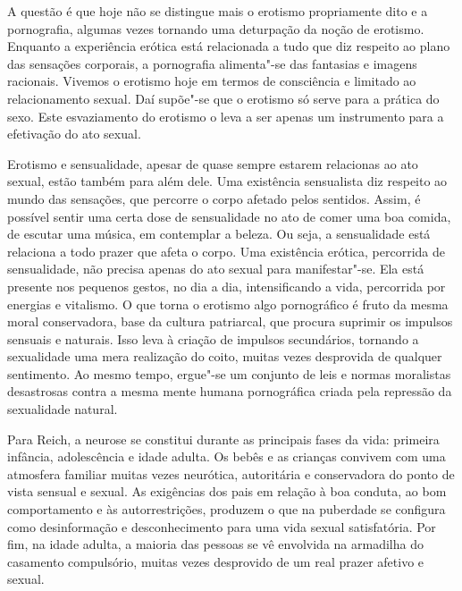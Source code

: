 A questão é que hoje não se distingue mais o erotismo propriamente dito
e a pornografia, algumas vezes tornando uma deturpação da noção de
erotismo. Enquanto a experiência erótica está relacionada a tudo que diz
respeito ao plano das sensações corporais, a pornografia alimenta"-se das
fantasias e imagens racionais. Vivemos o erotismo hoje em termos de
consciência e limitado ao relacionamento sexual. Daí supõe"-se que o
erotismo só serve para a prática do sexo. Este esvaziamento do erotismo
o leva a ser apenas um instrumento para a efetivação do ato sexual.

Erotismo e sensualidade, apesar de quase sempre estarem relacionas ao
ato sexual, estão também para além dele. Uma existência sensualista diz
respeito ao mundo das sensações, que percorre o corpo afetado pelos
sentidos. Assim, é possível sentir uma certa dose de sensualidade no ato
de comer uma boa comida, de escutar uma música, em contemplar a beleza.
Ou seja, a sensualidade está relaciona a todo prazer que afeta o corpo.
Uma existência erótica, percorrida de sensualidade, não precisa apenas
do ato sexual para manifestar"-se. Ela está presente nos pequenos gestos,
no dia a dia, intensificando a vida, percorrida por energias e
vitalismo. O que torna o erotismo algo pornográfico é fruto da mesma
moral conservadora, base da cultura patriarcal, que procura suprimir os
impulsos sensuais e naturais. Isso leva à criação de impulsos
secundários, tornando a sexualidade uma mera realização do coito, muitas
vezes desprovida de qualquer sentimento. Ao mesmo tempo, ergue"-se um
conjunto de leis e normas moralistas desastrosas contra a mesma mente
humana pornográfica criada pela repressão da sexualidade natural.

Para Reich, a neurose se constitui durante as principais fases da vida:
primeira infância, adolescência e idade adulta. Os bebês e as crianças
convivem com uma atmosfera familiar muitas vezes neurótica, autoritária
e conservadora do ponto de vista sensual e sexual. As exigências dos
pais em relação à boa conduta, ao bom comportamento e às
autorrestrições, produzem o que na puberdade se configura como
desinformação e desconhecimento para uma vida sexual satisfatória. Por
fim, na idade adulta, a maioria das pessoas se vê envolvida na armadilha
do casamento compulsório, muitas vezes desprovido de um real prazer
afetivo e sexual.


